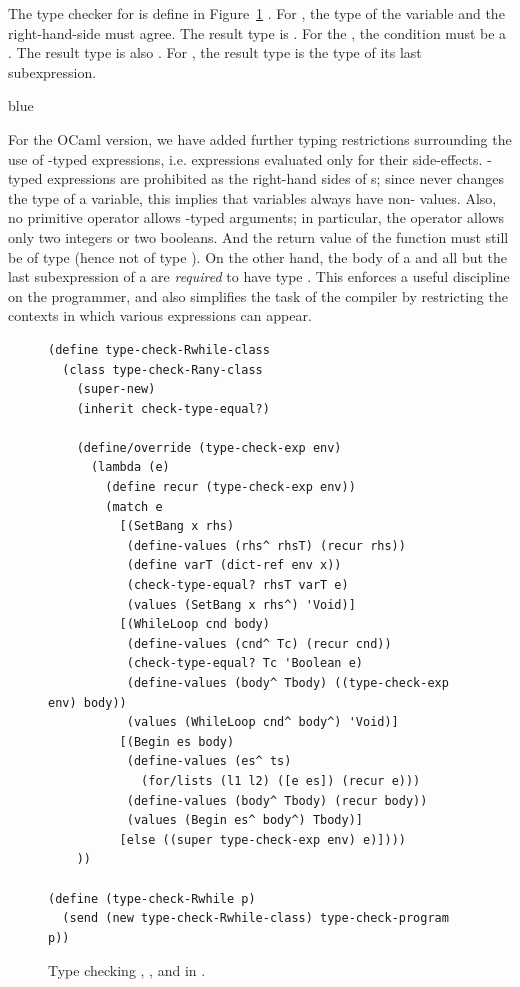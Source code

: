 \documentclass[11pt]{book}
\newcommand{\ocaml}[1]{{\color{blue}{#1}}}
\newenvironment{ocamlx}{
  \begin{color}{blue}
}
{
  \end{color}
}
\begin{document}
The type checker for \LangLoop{} is define\ocaml{d} in
Figure~\ref{fig:type-check-Rwhile} \ocaml{(OCaml: In file \code{RWhile.ml})}. For , the type of the
variable and the right-hand-side must agree. The result type is
. For the , the condition must be a
. The result type is also .  For
, the result type is the type of its last subexpression.

\begin{ocamlx}
  For the OCaml version, we have added further typing restrictions surrounding
  the use of -typed expressions, i.e. expressions evaluated only for
  their side-effects. -typed expressions are prohibited as the right-hand sides of s;
  since \code{:=} never changes the type of a variable, this implies that variables always
  have non- values. Also, no primitive operator allows -typed arguments;
  in particular, the \code{=} operator allows only two integers or two booleans. And the return
  value of the function must still be of type  (hence not of type ).  On the other
  hand, the body of a  and all but the last subexpression of a  are \emph{required}
  to have type . This enforces a useful discipline on the \LangLoop{} programmer,
  and also simplifies the task of the compiler by restricting the contexts in which various
  expressions can appear. 
\end{ocamlx}  

\begin{figure}[tbp]
\begin{lstlisting}[basicstyle=\ttfamily\footnotesize]
(define type-check-Rwhile-class
  (class type-check-Rany-class
    (super-new)
    (inherit check-type-equal?)

    (define/override (type-check-exp env)
      (lambda (e)
        (define recur (type-check-exp env))
        (match e
          [(SetBang x rhs)
           (define-values (rhs^ rhsT) (recur rhs))
           (define varT (dict-ref env x))
           (check-type-equal? rhsT varT e)
           (values (SetBang x rhs^) 'Void)]
          [(WhileLoop cnd body)
           (define-values (cnd^ Tc) (recur cnd))
           (check-type-equal? Tc 'Boolean e)
           (define-values (body^ Tbody) ((type-check-exp env) body))
           (values (WhileLoop cnd^ body^) 'Void)]
          [(Begin es body)
           (define-values (es^ ts)
             (for/lists (l1 l2) ([e es]) (recur e)))
           (define-values (body^ Tbody) (recur body))
           (values (Begin es^ body^) Tbody)]
          [else ((super type-check-exp env) e)])))
    ))

(define (type-check-Rwhile p)
  (send (new type-check-Rwhile-class) type-check-program p))
\end{lstlisting}
\caption{Type checking , ,
    and  in \LangLoop{}.}
\label{fig:type-check-Rwhile}
\end{figure}
\end{document}
